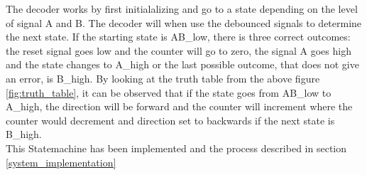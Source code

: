 \documentclass[../../../main]{subfiles}
\begin{document}
The decoder works by first initialalizing and go to a state depending on the level of signal A and B. The decoder will when use the debounced signals to determine the next state. If the starting state is AB\_low, there is three correct outcomes: the reset signal goes low and the counter will go to zero, the signal A goes high and the state changes to A\_high or the last possible outcome, that does not give an error, is B\_high. By looking at the truth table from the above figure \ref{fig:truth_table}, it can be observed that if the state goes from AB\_low to A\_high, the direction will be forward and the counter will increment where the counter would decrement and direction set to backwards if the next state is B\_high.\\ This Statemachine has been implemented and the process described in section \ref{system_implementation}

\begin{figure}[H]
  \centering
  \def\svgwidth{\columnwidth}
  \fontsize{9}{9}\selectfont
  
  \caption{}
\end{figure}
\end{document}
